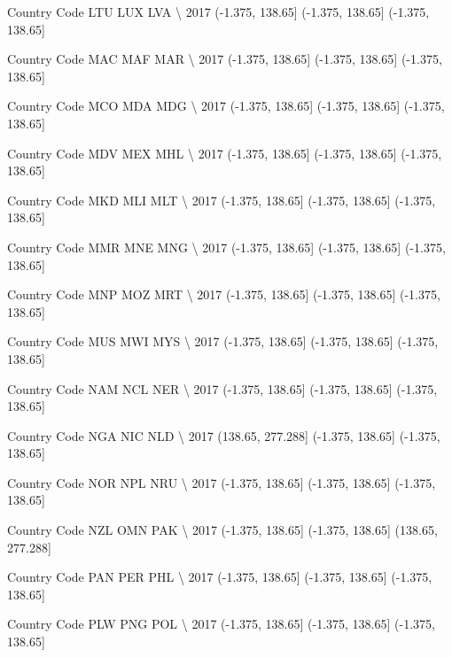 \documentclass[11pt]{article}
\begin{document}
Country Code               LTU               LUX               LVA  \textbackslash{}
2017          (-1.375, 138.65]  (-1.375, 138.65]  (-1.375, 138.65]   

Country Code               MAC               MAF               MAR  \textbackslash{}
2017          (-1.375, 138.65]  (-1.375, 138.65]  (-1.375, 138.65]   

Country Code               MCO               MDA               MDG  \textbackslash{}
2017          (-1.375, 138.65]  (-1.375, 138.65]  (-1.375, 138.65]   

Country Code               MDV               MEX               MHL  \textbackslash{}
2017          (-1.375, 138.65]  (-1.375, 138.65]  (-1.375, 138.65]   

Country Code               MKD               MLI               MLT  \textbackslash{}
2017          (-1.375, 138.65]  (-1.375, 138.65]  (-1.375, 138.65]   

Country Code               MMR               MNE               MNG  \textbackslash{}
2017          (-1.375, 138.65]  (-1.375, 138.65]  (-1.375, 138.65]   

Country Code               MNP               MOZ               MRT  \textbackslash{}
2017          (-1.375, 138.65]  (-1.375, 138.65]  (-1.375, 138.65]   

Country Code               MUS               MWI               MYS  \textbackslash{}
2017          (-1.375, 138.65]  (-1.375, 138.65]  (-1.375, 138.65]   

Country Code               NAM               NCL               NER  \textbackslash{}
2017          (-1.375, 138.65]  (-1.375, 138.65]  (-1.375, 138.65]   

Country Code                NGA               NIC               NLD  \textbackslash{}
2017          (138.65, 277.288]  (-1.375, 138.65]  (-1.375, 138.65]   

Country Code               NOR               NPL               NRU  \textbackslash{}
2017          (-1.375, 138.65]  (-1.375, 138.65]  (-1.375, 138.65]   

Country Code               NZL               OMN                PAK  \textbackslash{}
2017          (-1.375, 138.65]  (-1.375, 138.65]  (138.65, 277.288]   

Country Code               PAN               PER               PHL  \textbackslash{}
2017          (-1.375, 138.65]  (-1.375, 138.65]  (-1.375, 138.65]   

Country Code               PLW               PNG               POL  \textbackslash{}
2017          (-1.375, 138.65]  (-1.375, 138.65]  (-1.375, 138.65]   
\end{document}
